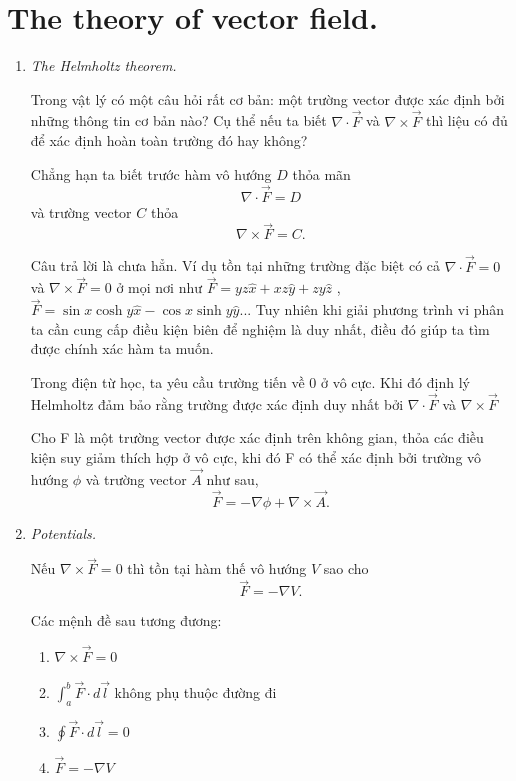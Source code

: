 \section{The theory of vector field.}
\begin{enumerate}

\item \textit{The Helmholtz theorem.}

Trong vật lý có một câu hỏi rất cơ bản: một trường vector được xác định bởi những thông tin cơ bản nào?
Cụ thể nếu ta biết $\nabla \cdot \vec{F}$ và $\nabla \times \vec{F}$ thì liệu có đủ để xác định hoàn toàn trường đó hay không?

Chẳng hạn ta biết trước hàm vô hướng $D$ thỏa mãn
\[
\nabla \cdot \vec{F} = D
\]
và trường vector $C$ thỏa
\[
\nabla \times \vec{F} = C.
\]

Câu trả lời là chưa hẳn. Ví dụ tồn tại những trường đặc biệt có cả $\nabla \cdot \vec{F} = 0$ và $\nabla \times \vec{F} = 0$ ở mọi nơi như $\vec{F} = yz\hat{x} + xz\hat{y} + zy\hat{z}$ , $\vec{F} = \sin{x}\cosh{y}\hat{x} - \cos{x}\sinh{y}\hat{y}$...
Tuy nhiên khi giải phương trình vi phân ta cần cung cấp điều kiện biên để nghiệm là duy nhất, điều đó giúp ta tìm được chính xác hàm ta muốn.

Trong điện từ học, ta yêu cầu trường tiến về $0$ ở vô cực. Khi đó định lý Helmholtz đảm bảo rằng trường được xác định duy nhất bởi $\nabla \cdot \vec{F}$ và $\nabla \times \vec{F}$

Cho F là một trường vector được xác định trên không gian, thỏa các điều kiện suy giảm thích hợp ở vô cực, khi đó F có thể xác định bởi trường vô hướng $\phi$ và trường vector $\vec{A}$ như sau,
\[
\vec{F} = -\nabla \phi + \nabla \times \vec{A}.
\]

\item \textit{Potentials.}

Nếu $\nabla \times \vec{F} = 0$ thì tồn tại hàm thế vô hướng $V$ sao cho
\[
\vec{F} = -\nabla V.
\]

\begin{theorem}
Các mệnh đề sau tương đương:
\begin{enumerate}
\item[(a)] $\nabla \times \vec{F} = 0$
\item[(b)] $\displaystyle \int_a^b \vec{F} \cdot d\vec{l}$ không phụ thuộc đường đi
\item[(c)] $\displaystyle \oint \vec{F} \cdot d\vec{l} = 0$
\item[(d)] $\vec{F} = -\nabla V$
\end{enumerate}
\end{theorem}


\end{enumerate}
